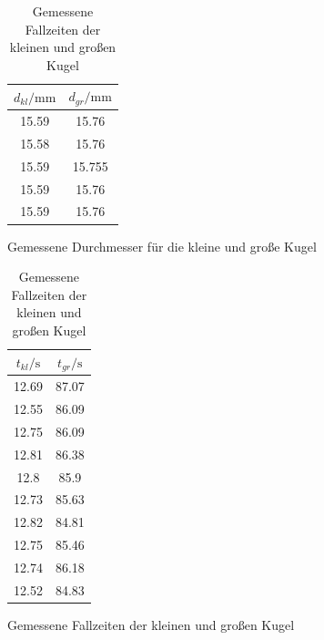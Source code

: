 \begin{table}
  \centering
  \caption{Messwerte des ersten Versuchsteil}
  \begin{subfigure}{0.48\textwidth}
    \centering
  \begin{tabular}{c c}
    \toprule
    $d_{kl} /\si{\milli\meter}$ & $d_{gr}/ \si{\milli\meter}$ \\
    \midrule
    15.59 & 15.76 \\
    15.58 & 15.76 \\
    15.59 & 15.755 \\
    15.59 & 15.76 \\
    15.59 & 15.76 \\
    \bottomrule
  \end{tabular}
  \caption{Gemessene Durchmesser für die kleine und große Kugel}
  \label{tab:dtab}
  \end{subfigure}
  \begin{subfigure}{0.48\textwidth}
    \centering
        \begin{tabular}{c c}
          \toprule
          $t_{kl} / \si{\second}$ & $t_{gr} / \si{\second} $\\
          \midrule
          12.69 & 87.07 \\
          12.55 & 86.09 \\
          12.75 & 86.09 \\
          12.81  & 86.38 \\
          12.8 & 85.9 \\
          12.73 & 85.63 \\
          12.82 & 84.81 \\
          12.75 & 85.46 \\
          12.74 & 86.18 \\
          12.52 & 84.83 \\
          \bottomrule
        \end{tabular}
        \caption{Gemessene Fallzeiten der kleinen und großen Kugel}
        \label{tab:t}
\end{subfigure}
\end{table}
\FloatBarrier
